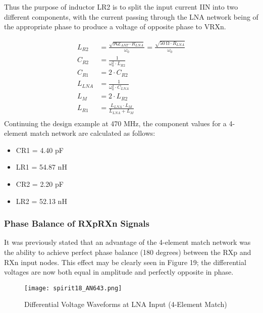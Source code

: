         Thus the purpose of inductor LR2 is to split the input current IIN into two different components, 
        with the current passing through the LNA network being of the appropriate phase to produce a voltage 
        of opposite phase to VRXn.
        
        \begin{align}
          L_{R2}  &= \frac{\sqrt{\Re{Z_{ANT}}\cdot R_{LNA}}}{\omega_0} 
                   = \frac{\sqrt{\SI{50}{\ohm}\cdot R_{LNA}}}{\omega_0}  \label{EXP001:eq_spirit20}      \\ 
          C_{R2}  &= \frac{1}{\omega_0^2\cdot L_{R2}}                    \label{EXP001:eq_spirit21}      \\ 
          C_{R1}  &= 2\cdot C_{R2}                                       \label{EXP001:eq_spirit22}      \\ 
          L_{LNA} &= \frac{1}{\omega_0^2\cdot C_{LNA}}                   \label{EXP001:eq_spirit23}      \\ 
          L_{M}   &= 2\cdot L_{R2}                                       \label{EXP001:eq_spirit24}      \\ 
          L_{R1}  &= \frac{L_{LNA}\cdot L_M}{L_{LNA} + L_M}              \label{EXP001:eq_spirit25} \\
        \end{align}
        Continuing the design example at 470 MHz, the component values for a 4-element match network are 
        calculated as follows:
        \begin{itemize}
          \item CR1 = 4.40 pF
          \item LR1 = 54.87 nH
          \item CR2 = 2.20 pF
          \item LR2 = 52.13 nH          
        \end{itemize}
        
      \subsubsection{Phase Balance of RXp\/RXn Signals}
        It was previously stated that an advantage of the 4-element match network was the ability to achieve 
        perfect phase balance (180 degrees) between the RXp and RXn input nodes. This effect may be clearly 
        seen in Figure 19; the differential voltages are now both equal in amplitude and perfectly opposite 
        in phase.
        
        \begin{figure}[ht!] %
          \centering
          \texttt{[image: spirit18\_AN643.png]}
          \caption{Differential Voltage Waveforms at LNA Input (4-Element Match)}
          \label{EXP001:fig_spirit19}
        \end{figure}
        
